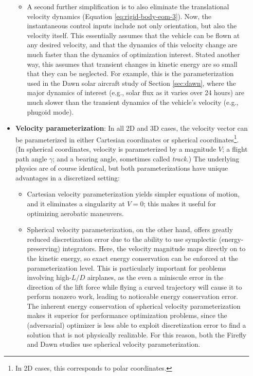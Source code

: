 \begin{itemize}
\begin{itemize}
        \item A second further simplification is to also eliminate the translational velocity dynamics (Equation \ref{eq:rigid-body-eom-3}). Now, the instantaneous control inputs include not only orientation, but also the velocity itself. This essentially assumes that the vehicle can be flown at any desired velocity, and that the dynamics of this velocity change are much faster than the dynamics of optimization interest. Stated another way, this assumes that transient changes in kinetic energy are so small that they can be neglected. For example, this is the parameterization used in the Dawn solar aircraft study of Section \ref{sec:dawn}, where the major dynamics of interest (e.g., solar flux as it varies over 24 hours) are much slower than the transient dynamics of the vehicle's velocity (e.g., phugoid mode).
    \end{itemize}
    \item \textbf{Velocity parameterization}: In all 2D and 3D cases, the velocity vector can be parameterized in either Cartesian coordinates or spherical coordinates\footnote{In 2D cases, this corresponds to polar coordinates.}. (In spherical coordinates, velocity is parameterized by a magnitude $V$; a flight path angle $\gamma$; and a bearing angle, sometimes called \emph{track}.) The underlying physics are of course identical, but both parameterizations have unique advantages in a discretized setting:
    \begin{itemize}
        \item Cartesian velocity parameterization yields simpler equations of motion, and it eliminates a singularity at $V=0$; this makes it useful for optimizing aerobatic maneuvers.
        \item Spherical velocity parameterization, on the other hand, offers greatly reduced discretization error due to the ability to use symplectic (energy-preserving) integrators. Here, the velocity magnitude maps directly on to the kinetic energy, so exact energy conservation can be enforced at the parameterization level. This is particularly important for problems involving high-$L/D$ airplanes, as the even a miniscule error in the direction of the lift force while flying a curved trajectory will cause it to perform nonzero work, leading to noticeable energy conservation error. The inherent energy conservation of spherical velocity parameterization makes it superior for performance optimization problems, since the (adversarial) optimizer is less able to exploit discretization error to find a solution that is not physically realizable. For this reason, both the Firefly and Dawn studies use spherical velocity parameterization.
    \end{itemize}
\end{itemize}

